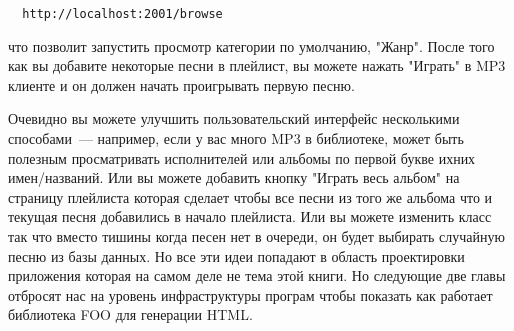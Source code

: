 \begin{verbatim}
  http://localhost:2001/browse
\end{verbatim}

что позволит запустить просмотр категории по умолчанию, "Жанр". После того как вы добавите
некоторые песни в плейлист, вы можете нажать "Играть" в MP3 клиенте и он должен начать
проигрывать первую песню. 

Очевидно вы можете улучшить пользовательский интерфейс несколькими способами~--- например,
если у вас много MP3 в библиотеке, может быть полезным просматривать исполнителей или
альбомы по первой букве ихних имен/названий. Или вы можете добавить кнопку "Играть весь
альбом" на страницу плейлиста которая сделает чтобы все песни из того же альбома что и
текущая песня добавились в начало плейлиста. Или вы можете изменить класс 
так что вместо тишины когда песен нет в очереди, он будет выбирать случайную песню из базы
данных. Но все эти идеи попадают в область проектировки приложения которая на самом деле
не тема этой книги. Но следующие две главы отбросят нас на уровень инфраструктуры програм
чтобы показать как работает библиотека FOO для генерации HTML.

